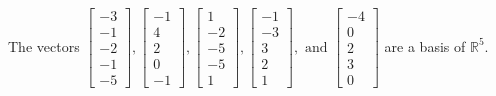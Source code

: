 \begin{exercise}
\begin{exerciseStatement}
  \end{exerciseStatement}
  \begin{exerciseAnswer}
   The vectors \(\left[\begin{array}{r}
-3 \\
-1 \\
-2 \\
-1 \\
-5
\end{array}\right] , \left[\begin{array}{r}
-1 \\
4 \\
2 \\
0 \\
-1
\end{array}\right] , \left[\begin{array}{r}
1 \\
-2 \\
-5 \\
-5 \\
1
\end{array}\right] , \left[\begin{array}{r}
-1 \\
-3 \\
3 \\
2 \\
1
\end{array}\right] , \text{ and } \left[\begin{array}{r}
-4 \\
0 \\
2 \\
3 \\
0
\end{array}\right]\) 
  	 are  a basis of \(\mathbb{R}^5\).
  


  \end{exerciseAnswer}
\end{exercise}